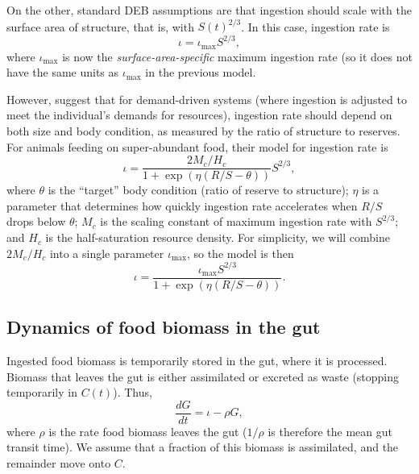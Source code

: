\documentclass[12pt,reqno,final,pdftex]{amsart}\usepackage[]{graphicx}\usepackage[]{color}
\theoremstyle{plain}
\numberwithin{equation}{part}
\begin{document}
On the other, standard DEB assumptions are that ingestion should scale with the surface area of structure, that is, with $S(t)^{2/3}$.
In this case, ingestion rate is
\begin{equation}
\iota=\iota_{\max }S^{2/3},
\end{equation}
where $\iota_{\max}$ is now the \emph{surface-area-specific} maximum ingestion rate (so it does not have the same units as $\iota_{\max}$ in the previous model.

However, \citet{deRoos2013} suggest that for demand-driven systems (where ingestion is adjusted to meet the individual's demands for resources), ingestion rate should depend on both size and body condition, as measured by the ratio of structure to reserves.
For animals feeding on super-abundant food, their model for ingestion rate is
\begin{equation}
\iota = \frac{2M_c/H_c}{1 + \exp\left(\eta(R/S-\theta)\right)}S^{2/3},
\end{equation}
where $\theta$ is the ``target'' body condition (ratio of reserve to structure); $\eta$ is a parameter that determines how quickly ingestion rate accelerates when $R/S$ drops below $\theta$; $M_c$ is the scaling constant of maximum ingestion rate with $S^{2/3}$; and $H_c$ is the half-saturation resource density.
For simplicity, we will combine $2M_c/H_c$ into a single parameter $\iota_{\max}$, so the model is then
\begin{equation}
\iota = \frac{\iota_{\max}S^{2/3}}{1 + \exp\left(\eta(R/S-\theta)\right)}.
\end{equation}


\subsection*{Dynamics of food biomass in the gut}
Ingested food biomass is temporarily stored in the gut, where it is processed.
Biomass that leaves the gut is either assimilated or excreted as waste (stopping temporarily in $C(t)$).
Thus,
\begin{equation}
\frac{dG}{dt} = \iota - \rho G,
\end{equation}
where $\rho$ is the rate food biomass leaves the gut ($1/\rho$ is therefore the mean gut transit time).
We assume that a fraction of this biomass is assimilated, and the remainder move onto $C$.
\end{document}
